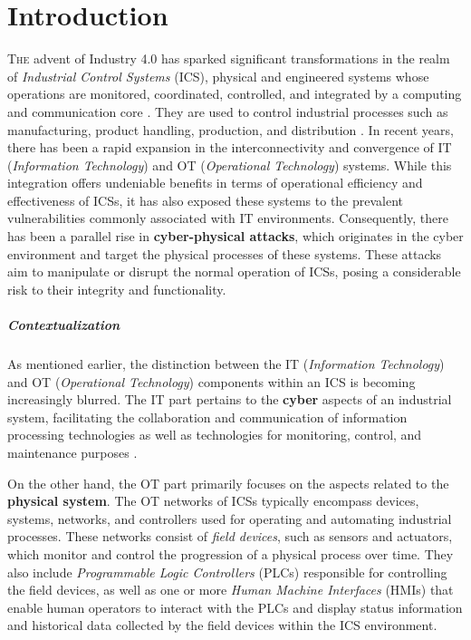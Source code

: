 \chapter{Introduction}
\label{intro}
\linenumbers

\lettrine[lines=2]{T}{he} advent of Industry 4.0 has sparked significant transformations in the realm of \textit{Industrial Control Systems} (ICS), physical and engineered systems whose operations are monitored, coordinated, controlled, and integrated by a computing and communication core \cite{ics_definition_giusta}. They are used to control industrial processes such as manufacturing, product handling, production, and distribution \cite{ics_definition}. In recent years, there has been a rapid expansion in the interconnectivity and convergence of IT (\textit{Information Technology}) and OT (\textit{Operational Technology}) systems. While this integration offers undeniable benefits in terms of operational efficiency and effectiveness of ICSs, it has also exposed these systems to the prevalent vulnerabilities commonly associated with IT environments. Consequently, there has been a parallel rise in \textbf{cyber-physical attacks}, which originates in the cyber environment and target the physical processes of these systems. These attacks aim to manipulate or disrupt the normal operation of ICSs, posing a considerable risk to their integrity and functionality.

\paragraph{Contextualization}
\label{par:1_context}
As mentioned earlier, the distinction between the IT (\textit{Information Technology}) and OT (\textit{Operational Technology}) components within an ICS is becoming increasingly blurred. The IT part pertains to the \textbf{cyber} aspects of an industrial system, facilitating the collaboration and communication of information processing technologies as well as technologies for monitoring, control, and maintenance purposes \cite{tesi_phd_norvegese}.

On the other hand, the OT part primarily focuses on the aspects related to the \textbf{physical system}. The OT networks of ICSs typically encompass devices, systems, networks, and controllers used for operating and automating industrial processes. These networks consist of \textit{field devices}, such as sensors and actuators, which monitor and control the progression of a physical process over time. They also include \textit{Programmable Logic Controllers} (PLCs) responsible for controlling the field devices, as well as one or more \textit{Human Machine Interfaces} (HMIs) that enable human operators to interact with the PLCs and display status information and historical data collected by the field devices within the ICS environment.

